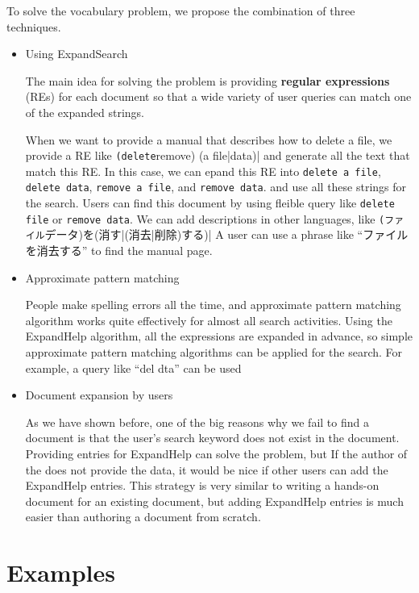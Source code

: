 \documentclass[manuscript,screen,review]{acmart}
\begin{document}
To solve the vocabulary problem, we propose the combination of three techniques.

\begin{itemize}

\item Using ExpandSearch

The main idea for solving the problem is 
providing \textbf{regular expressions} (REs)
for  each document so that a wide variety of user queries can match one of the expanded strings.

When we want to provide a manual that describes how to delete a file, 
we provide a RE like \verb|(delete|remove) (a file|data)|
and generate all the text that match this RE.
In this case, we can epand this RE into
\verb|delete a file|,
\verb|delete data|,
\verb|remove a file|, and
\verb|remove data|.
and use all these strings for the search.
Users can find this document by using fleible query like
\verb|delete file| or
\verb|remove data|.
We can add descriptions in other languages, like \verb|(ファイル|データ)を(消す|(消去|削除)する)|
A user can use a phrase like ``ファイルを消去する'' to find the manual page.

\item Approximate pattern matching

People make spelling errors all the time, and approximate pattern matching algorithm works quite effectively for almost all search activities.
Using the ExpandHelp algorithm, all the expressions are expanded in advance,
so simple approximate pattern matching algorithms can be applied for the search.
For example, a query like ``del dta'' can be used

\item Document expansion by users

As we have shown before, one of the big reasons why we fail to find a document is that
the user's search keyword does not exist in the document.
 Providing entries for ExpandHelp can solve the problem, but
If the author of the does not provide the data, it would be nice if other users can add
the ExpandHelp entries.
This strategy is very similar to writing a hands-on document for an existing document,
but adding ExpandHelp entries is much easier than authoring  a document from scratch.

\end{itemize}

\section{Examples}
\end{document}
